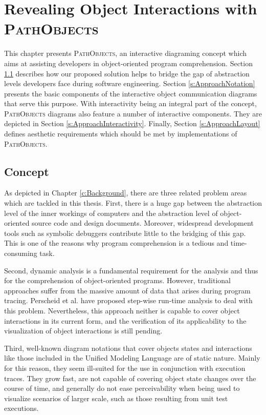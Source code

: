 \chapter{Revealing Object Interactions with \textsc{PathObjects}}
\label{c:approach}
This chapter presents \textsc{PathObjects}, an interactive diagraming concept which aims at assisting developers in object-oriented program comprehension.
Section \ref{s:ApproachConcept} describes how our proposed solution helps to bridge the gap of abstraction levels developers face during software engineering.
Section \ref{s:ApproachNotation} presents the basic components of the interactive object communication diagrams that serve this purpose.
With interactivity being an integral part of the concept, \textsc{PathObjects} diagrams also feature a number of interactive components.
They are depicted in Section \ref{s:ApproachInteractivity}.
Finally, Section \ref{s:ApproachLayout} defines aesthetic requirements which should be met by implementations of \textsc{PathObjects}.

\section{Concept}
\label{s:ApproachConcept}
As depicted in Chapter \ref{c:Background}, there are three related problem areas which are tackled in this thesis.
First, there is a huge gap between the abstraction level of the inner workings of computers and the abstraction level of object-oriented source code and design documents.
Moreover, widespread development tools such as symbolic debuggers contribute little to the bridging of this gap.
This is one of the reasons why program comprehension is a tedious and time-consuming task.

Second, dynamic analysis is a fundamental requirement for the analysis and thus for the comprehension of object-oriented programs.
However, traditional approaches suffer from the massive amount of data that arises during program tracing.
Perscheid et al. have proposed step-wise run-time analysis to deal with this problem.
Nevertheless, this approach neither is capable to cover object interactions in its current form, and the verification of its applicability to the visualization of object interactions is still pending.

Third, well-known diagram notations that cover objects states and interactions like those included in the Unified Modeling Language are of static nature.
Mainly for this reason, they seem ill-suited for the use in conjunction with execution traces.
They grow fast, are not capable of covering object state changes over the course of time, and generally do not ease perceivability when being used to visualize scenarios of larger scale, such as those resulting from unit test executions.

